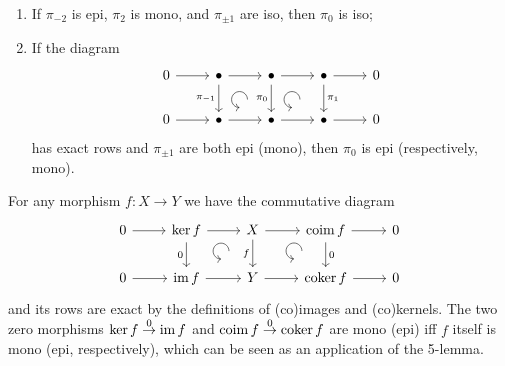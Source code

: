 \begin{cor}
    \begin{enumerate}
        \item If $\pi_{-2}$ is epi, $\pi_2$ is mono, and $\pi_{\pm 1}$ are iso, then $\pi_0$ is iso;
        \item If the diagram
        \[\begin{tikzcd}[every matrix/.append style={name=m},   
        execute at end picture={\draw [<-] ([xshift=-8mm,yshift=-10mm]m-1-3.north) arc[start angle=-90,delta angle=-270,radius=0.2cm];
        \draw [<-] ([xshift=-8mm,yshift=-10mm]m-1-4.north) arc[start angle=-90,delta angle=-270,radius=0.2cm];}]
        0\arrow[r] & \bullet\arrow[r]\arrow[d,swap,"\pi_{-1}"] & \bullet \arrow[r]\arrow[d,swap,"\pi_0"] & \bullet\arrow[d,"\pi_1"]\arrow[r] & 0 \\
       0\arrow[r] & \bullet\arrow[r] & \bullet\arrow[r] &\bullet \arrow[r] &0
    \end{tikzcd}\]
    has exact rows and $\pi_{\pm 1}$ are both epi (mono), then $\pi_0$ is epi (respectively, mono).
    \end{enumerate}
\end{cor}

\begin{example}
    For any morphism $f:X\to Y$ we have the commutative diagram
    \[\begin{tikzcd}[every matrix/.append style={name=m},   
        execute at end picture={\draw [<-] ([xshift=-8mm,yshift=-10mm]m-1-3.north) arc[start angle=-90,delta angle=-270,radius=0.2cm];
        \draw [<-] ([xshift=-8mm,yshift=-10mm]m-1-4.north) arc[start angle=-90,delta angle=-270,radius=0.2cm];}]
        0\arrow[r] & \ker f \arrow[r]\arrow[d,swap,"0"] & X \arrow[r]\arrow[d,swap,"f"] & \coim f\arrow[d,"0"]\arrow[r] & 0 \\
       0\arrow[r] & \im f\arrow[r] & Y\arrow[r] &\coker f \arrow[r] &0
    \end{tikzcd}\]
    and its rows are exact by the definitions of (co)images and (co)kernels. The two zero morphisms $\ker f\overset{0}{\to} \operatorname{im} f$ and $\operatorname{coim} f\overset{0}{\to} \operatorname{coker} f$ are mono (epi) iff $f$ itself is mono (epi, respectively), which can be seen as an application of the 5-lemma.
\end{example}

